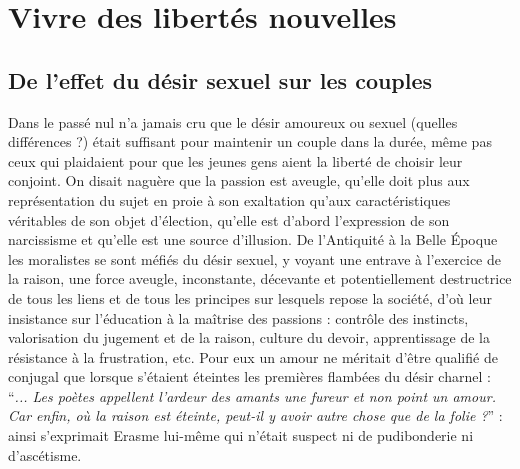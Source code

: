 

\part{Vivre des libertés nouvelles}

 \chapter{De l'effet du désir sexuel sur les couples}
 

 
 
Dans le passé nul n'a jamais cru que le désir amoureux ou sexuel (quelles différences ?) était suffisant pour maintenir un couple dans la durée, même pas ceux qui plaidaient pour que les jeunes gens aient la liberté de choisir leur conjoint. On disait naguère que la passion est aveugle, qu'elle doit plus aux représentation du sujet en proie à son exaltation qu'aux caractéristiques véritables de son objet d'élection, qu'elle est d'abord l'expression de son narcissisme et qu'elle est une source d'illusion. De l'Antiquité à la Belle Époque les moralistes se sont méfiés du désir sexuel, y voyant une entrave à l'exercice de la raison, une force aveugle, inconstante, décevante et potentiellement destructrice de tous les liens et de tous les principes sur lesquels repose la société, d'où leur insistance sur l'éducation à la maîtrise des passions : contrôle des instincts, valorisation du jugement et de la raison, culture du devoir, apprentissage de la résistance à la frustration, etc. Pour eux un amour ne méritait d'être qualifié de conjugal que lorsque s'étaient éteintes les premières flambées du désir charnel : \enquote{\emph{... Les poètes appellent l'ardeur des amants une fureur et non point un amour. Car enfin, où la raison est éteinte, peut-il y avoir autre chose que de la folie ?}} : ainsi s'exprimait Erasme lui-même qui n'était suspect ni de pudibonderie ni d'ascétisme.


